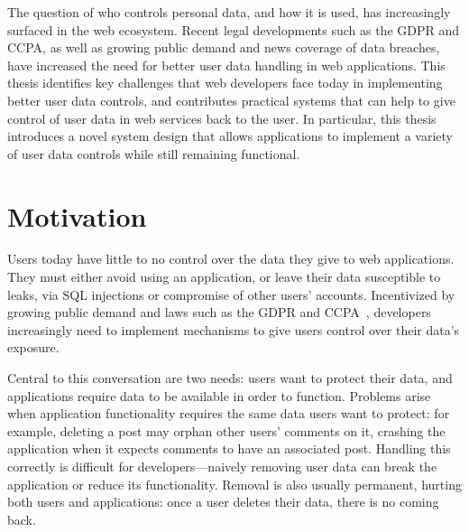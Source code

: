 The question of who controls personal data, and how it is used, has increasingly
surfaced in the web ecosystem. 
%
Recent legal developments such as the GDPR and CCPA, as well as growing public
demand and news coverage of \eg data breaches, have increased the need for
better user data handling in web applications. 
%
%
This thesis identifies key challenges that web developers face today in
implementing better user data controls, and contributes practical systems that
can help to give control of user data in web services back to the user.
%
In particular, this thesis introduces a novel system design that allows
applications to implement a variety of user data controls while still remaining
functional.

\section{Motivation}
\label{sec:intro:motivation}
Users today have little to no control over the data they give to web
applications.  They must either avoid using an application, or leave their data
susceptible to leaks, \eg via SQL injections or compromise of other users'
accounts.  Incentivized by growing public demand and laws such as the GDPR and
CCPA~\cite{eu:gdpr, ccpa}, developers increasingly need to implement mechanisms
to give users control over their data’s exposure.

Central to this conversation are two needs: users want to protect their data,
and applications require data to be available in order to function. Problems
arise when application functionality requires the same data users want to
protect: for example, deleting a post may orphan other users' comments on it,
crashing the application when it expects comments to have an associated post.
Handling this correctly is difficult for developers---naively removing user data
can break the application or reduce its functionality. Removal is also usually
permanent, hurting both users and applications: once a user deletes their data,
there is no coming back.

